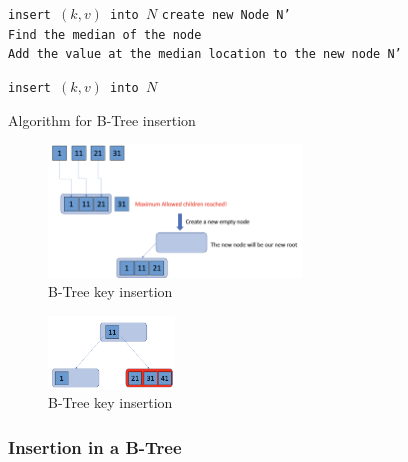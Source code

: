 \begin{algorithm}[H]
    \SetAlgoLined
     {
        \texttt{insert $(k,v)$ into $N$}
     }
     {
        \texttt{create new Node N'}\\
        \texttt{Find the median of the node}\\
        \texttt{Add the value at the median location to the new node N'}\\
     }
    {
    
        \texttt{insert $(k,v)$ into $N$}
        
    }
     \caption{Algorithm for B-Tree insertion}
     \label{B-Tree Insertion}
\end{algorithm}


\begin{figure}[htp]
    \centering
    \includegraphics[width=0.6\textwidth]{graphs/B-Tree_example01.png}
    \caption{B-Tree key insertion}
    \label{fig:B-Tree key insertion1}
\end{figure}

\begin{figure}[htp]
    \centering
    \includegraphics[width=0.3\textwidth]{graphs/B-Tree_example02.png}
    \caption{B-Tree key insertion}
    \label{fig:B-Tree key insertion2}
\end{figure}

\subsubsection{Insertion in a B-Tree}


